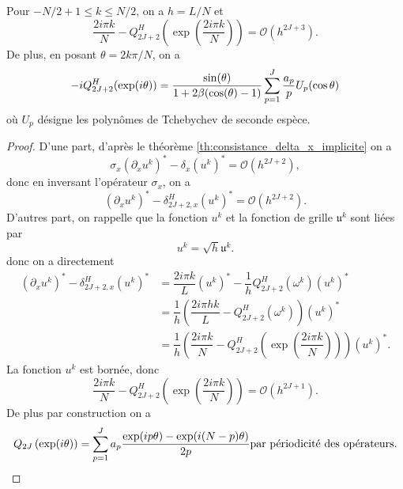 \begin{proposition}
Pour $-N/2+1  \leq k \leq N/2$, on a $h=L/N$ et 
\begin{equation}
\dfrac{2 i \pi k}{N} - Q_{2J+2}^H \left( \exp \left( \dfrac{2 i \pi k}{N} \right) \right) = \mathcal{O}(h^{2J+3}).
\end{equation}
De plus, en posant $\theta = 2 k \pi / N$, on a
\begin{equation}
- i Q_{2J+2}^H(\exp (i \theta) ) = \dfrac{\sin(\theta)}{1 +2 \beta (\cos (\theta) -1)} \displaystyle\sum\limits_{p=1}^J \dfrac{a_p}{p} U_p (\cos \theta ) 
\end{equation}
où $U_p$ désigne les polynômes de Tchebychev de seconde espèce.
\label{prop:hermitien_polynome}
\end{proposition}

\begin{proof}
D'une part, d'après le théorème \ref{th:consistance_delta_x_implicite} on a
\begin{equation}
\sigma_x (\partial_x u^k)^* - \delta_{x}(u^k)^* = \mathcal{O}(h^{2J+2}),
\end{equation}
donc en inversant l'opérateur $\sigma_x$, on a
\begin{equation}
(\partial_x u^k)^* - \delta_{2J+2,x}^H(u^k)^* = \mathcal{O}(h^{2J+2}).
\end{equation}
D'autres part, on rappelle que la fonction $u^k$ et la fonction de grille $\mathfrak{u}^k$ sont liées par
\begin{equation}
u^k = \sqrt{h} \mathfrak{u}^k.
\end{equation}
donc on a directement 
\begin{align*}
(\partial_x u^k)^* - \delta_{2J+2,x}^H (u^k)^* & = \dfrac{2 i \pi k}{L}(u^k)^* - \dfrac{1}{h}Q_{2J+2}^H(\omega^k) (u^k)^* \\
	& = \dfrac{1}{h} \left( \dfrac{2 i \pi h k}{L} - Q_{2J+2}^H(\omega^k) \right) (u^k)^*\\
	& = \dfrac{1}{h} \left( \dfrac{2 i \pi k}{N} - Q_{2J+2}^H \left( \exp \left( \dfrac{2 i \pi k}{N} \right) \right) \right) (u^k)^* .
\end{align*}
La fonction $u^k$ est bornée, donc
\begin{equation}
\dfrac{2 i \pi k}{N} - Q_{2J+2}^H \left( \exp \left( \dfrac{2 i \pi k}{N} \right) \right) = \mathcal{O}(h^{2J+1}).
\end{equation}
De plus par construction on a
\begin{align*}
Q_{2J} \left( \exp ( i \theta ) \right) & = \gsum_{p=1}^J a_p \dfrac{\exp ( i p \theta ) - \exp ( i (N-p) \theta )}{2 p} \text{par périodicité des opérateurs.} \\

\end{align*}
\end{proof}
